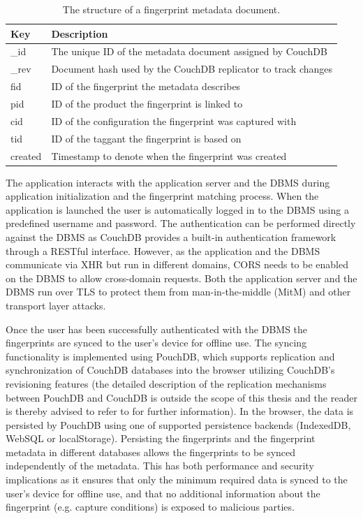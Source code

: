 \documentclass[thesis.tex]{subfiles}
\begin{document}
\begin{table}[ht]
	\caption{The structure of a fingerprint metadata document.} \label{table:fingerprint-metadata-schema}

	\begin{center}
	\begin{tabular}{| m{1.25cm} | m{11.5cm} |}

		\hline
		\textbf{Key}	& \textbf{Description} \\ \hline
		\_id			& The unique ID of the metadata document assigned by CouchDB \\
		\hline
		\_rev 			& Document hash used by the CouchDB replicator to track changes \\
		\hline
		fid 			& ID of the fingerprint the metadata describes \\
		\hline
		pid 			& ID of the product the fingerprint is linked to \\
		\hline
		cid 			& ID of the configuration the fingerprint was captured with \\
		\hline
		tid 			& ID of the taggant the fingerprint is based on \\
		\hline
		created			& Timestamp to denote when the fingerprint was created \\
		\hline
	\end{tabular}
	\end{center}
\end{table}

The application interacts with the application server and the DBMS during application initialization and the fingerprint matching process. When the application is launched the user is automatically logged in to the DBMS using a predefined username and password. The authentication can be performed directly against the DBMS as CouchDB provides a built-in authentication framework through a RESTful interface. However, as the application and the DBMS communicate via XHR but run in different domains, CORS needs to be enabled on the DBMS to allow cross-domain requests. Both the application server and the DBMS run over TLS to protect them from man-in-the-middle (MitM) and other transport layer attacks.

Once the user has been successfully authenticated with the DBMS the fingerprints are synced to the user's device for offline use. The syncing functionality is implemented using PouchDB, which supports replication and synchronization of CouchDB databases into the browser utilizing CouchDB's revisioning features (the detailed description of the replication mechanisms between PouchDB and CouchDB is outside the scope of this thesis and the reader is thereby advised to refer to \cite{pouch-couch-replication} for further information). In the browser, the data is persisted by PouchDB using one of supported persistence backends (IndexedDB, WebSQL or localStorage). Persisting the fingerprints and the fingerprint metadata in different databases allows the fingerprints to be synced independently of the metadata. This has both performance and security implications as it ensures that only the minimum required data is synced to the user's device for offline use, and that no additional information about the fingerprint (e.g. capture conditions) is exposed to malicious parties.
\end{document}
